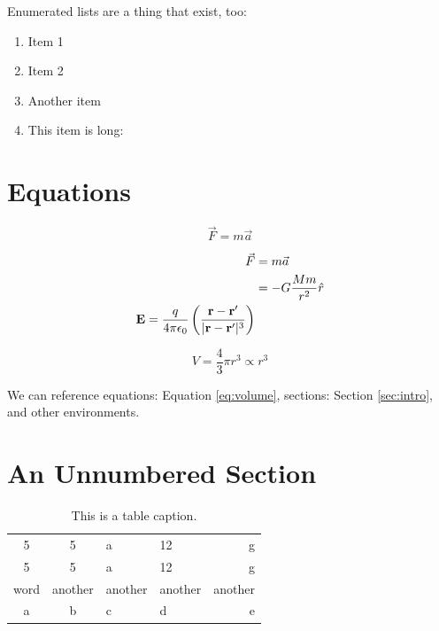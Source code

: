 \documentclass[12pt]{article}
\begin{document}
Enumerated lists are a thing that exist, too: 

\begin{enumerate}

\item Item 1
\item Item 2
\item Another item
\item This item is long: \lipsum[1]

\end{enumerate}


\section{Equations}

\begin{equation}
\vec{F} = m\vec{a}
\end{equation}

\begin{align}
\vec{F} &= m\vec{a}\notag\\
 &= -G \frac{Mm}{r^2} \hat{r} \\
\mathbf{E} = \frac{q}{4\pi\epsilon_0} \left(\frac{\mathbf{r - r'}}{|\mathbf{r - r'}|^3}\right)
\end{align}

\begin{equation}
\label{eq:volume}
V = \frac{4}{3}\pi r^3 \propto r^3
\end{equation}

We can reference equations: Equation \ref{eq:volume}, sections: Section \ref{sec:intro}, and other environments.


\section*{An Unnumbered Section}

\begin{table}[t]
\centering
\begin{tabular}{cc|l|lr}
\hline\hline
5 & 5 & a & 12 & g\\
5 & 5 & a & 12 & g\\
word & another & another & another & another\\
a & b & c & d & e\\
\hline\hline
\end{tabular}

\caption{This is a table caption.}
\label{tab:exampleTable}
\end{table}
\end{document}
